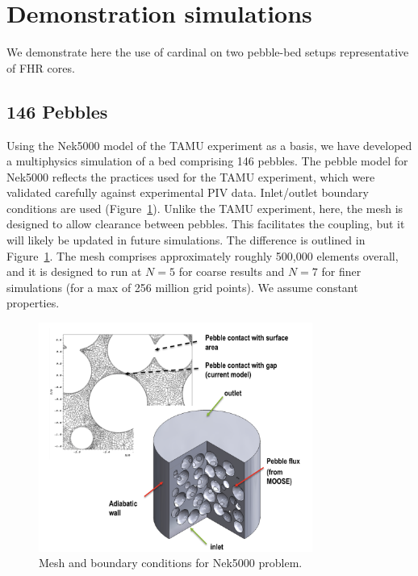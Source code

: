 \section{Demonstration simulations}
\label{s:demo}

We demonstrate here the use of cardinal on two pebble-bed setups representative of FHR cores.

\subsection{146 Pebbles}
\label{ss:c4}

Using the Nek5000 model of the TAMU experiment as a basis, we have developed a multiphysics simulation of a bed comprising 146 pebbles.
The pebble model for Nek5000 reflects the practices used for the TAMU experiment, which were validated carefully against experimental PIV data. Inlet/outlet boundary conditions are used (Figure~\ref{f:pb2}). Unlike the TAMU experiment, here, the mesh is designed to allow clearance between pebbles. This facilitates the coupling, but it will likely be updated in future simulations. The difference is outlined in Figure~\ref{f:pb2}. The mesh comprises approximately roughly 500,000 elements overall, and it is designed to run at $N=5$ for coarse results and $N=7$ for finer simulations (for a max of 256 million grid points). We assume constant properties.

\begin{figure}[!h]
\centering
\includegraphics[clip=true,width=0.8\textwidth]{Figures/pb_mesh}
\caption{Mesh and boundary conditions for Nek5000 problem.}
\label{f:pb2}
\end{figure}

